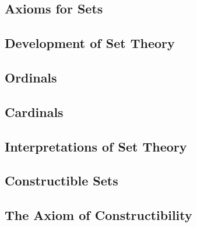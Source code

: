 \subsection{Axioms for Sets}


\subsection{Development of Set Theory}


\subsection{Ordinals}


\subsection{Cardinals}


\subsection{Interpretations of Set Theory}


\subsection{Constructible Sets}


\subsection{The Axiom of Constructibility}

